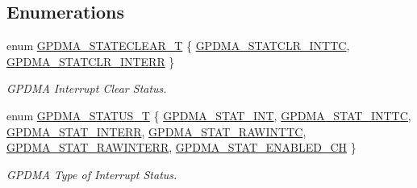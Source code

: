 \subsection*{Enumerations}
\begin{DoxyCompactItemize}
\item 
enum \hyperlink{group___g_p_d_m_a__18_x_x__43_x_x_gabbb281ef4b818f2e60167cf766f94fdb}{G\+P\+D\+M\+A\+\_\+\+S\+T\+A\+T\+E\+C\+L\+E\+A\+R\+\_\+T} \{ \hyperlink{group___g_p_d_m_a__18_x_x__43_x_x_ggabbb281ef4b818f2e60167cf766f94fdba9a0c8256eb0f656d56f065914219c96c}{G\+P\+D\+M\+A\+\_\+\+S\+T\+A\+T\+C\+L\+R\+\_\+\+I\+N\+T\+TC}, 
\hyperlink{group___g_p_d_m_a__18_x_x__43_x_x_ggabbb281ef4b818f2e60167cf766f94fdbaf6e975b9dfa7d659d18a377c7873b92a}{G\+P\+D\+M\+A\+\_\+\+S\+T\+A\+T\+C\+L\+R\+\_\+\+I\+N\+T\+E\+RR}
 \}\begin{DoxyCompactList}\small\item\em G\+P\+D\+MA Interrupt Clear Status. \end{DoxyCompactList}
\item 
enum \hyperlink{group___g_p_d_m_a__18_x_x__43_x_x_ga2f4aa97bd0ffa5046c8e2b17028d99cc}{G\+P\+D\+M\+A\+\_\+\+S\+T\+A\+T\+U\+S\+\_\+T} \{ \newline
\hyperlink{group___g_p_d_m_a__18_x_x__43_x_x_gga2f4aa97bd0ffa5046c8e2b17028d99ccaf89b610470a940617af6bef4f4451aa9}{G\+P\+D\+M\+A\+\_\+\+S\+T\+A\+T\+\_\+\+I\+NT}, 
\hyperlink{group___g_p_d_m_a__18_x_x__43_x_x_gga2f4aa97bd0ffa5046c8e2b17028d99ccac093908914ed40148e81169fc15df2f7}{G\+P\+D\+M\+A\+\_\+\+S\+T\+A\+T\+\_\+\+I\+N\+T\+TC}, 
\hyperlink{group___g_p_d_m_a__18_x_x__43_x_x_gga2f4aa97bd0ffa5046c8e2b17028d99ccaee7927c433e007f270c365bcca865706}{G\+P\+D\+M\+A\+\_\+\+S\+T\+A\+T\+\_\+\+I\+N\+T\+E\+RR}, 
\hyperlink{group___g_p_d_m_a__18_x_x__43_x_x_gga2f4aa97bd0ffa5046c8e2b17028d99cca4a74b1bc907fbbdbf9dfb05222f0b513}{G\+P\+D\+M\+A\+\_\+\+S\+T\+A\+T\+\_\+\+R\+A\+W\+I\+N\+T\+TC}, 
\newline
\hyperlink{group___g_p_d_m_a__18_x_x__43_x_x_gga2f4aa97bd0ffa5046c8e2b17028d99ccad547775dc5510034932bf1597931e899}{G\+P\+D\+M\+A\+\_\+\+S\+T\+A\+T\+\_\+\+R\+A\+W\+I\+N\+T\+E\+RR}, 
\hyperlink{group___g_p_d_m_a__18_x_x__43_x_x_gga2f4aa97bd0ffa5046c8e2b17028d99cca711d88f645a203338f297a286b912767}{G\+P\+D\+M\+A\+\_\+\+S\+T\+A\+T\+\_\+\+E\+N\+A\+B\+L\+E\+D\+\_\+\+CH}
 \}\begin{DoxyCompactList}\small\item\em G\+P\+D\+MA Type of Interrupt Status. \end{DoxyCompactList}
\item 

\end{DoxyCompactItemize}
